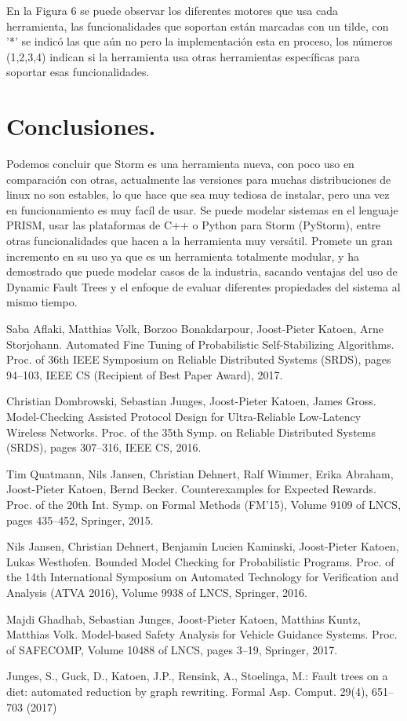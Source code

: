 \documentclass[11pt]{article}
\begin{document}
En la Figura 6 se puede observar los diferentes motores que usa cada herramienta, las funcionalidades que soportan est\'an marcadas con un tilde, con '*' se indic\'o las que a\'un no pero la implementaci\'on esta en proceso, los n\'umeros (1,2,3,4) indican si la herramienta usa otras herramientas espec\'ificas para soportar esas funcionalidades.

\section{Conclusiones.}

Podemos concluir que Storm es una herramienta nueva, con poco uso en comparaci\'on con otras, actualmente las versiones para muchas distribuciones de linux no son estables, lo que hace que sea muy tediosa de instalar, pero una vez en funcionamiento es muy fac\'il de usar. Se puede modelar sistemas en el lenguaje PRISM, usar las plataformas de C++ o Python para Storm (PyStorm), entre otras funcionalidades que hacen a la herramienta muy vers\'atil. Promete un gran incremento en su uso ya que es un herramienta totalmente modular, y ha demostrado que puede modelar casos de la industria, sacando ventajas del uso de Dynamic Fault Trees y el enfoque de evaluar diferentes propiedades del sistema al mismo tiempo.

\begin{thebibliography}{99}
	 Saba Aflaki, Matthias Volk, Borzoo Bonakdarpour, Joost-Pieter Katoen, Arne Storjohann. Automated Fine Tuning of Probabilistic Self-Stabilizing Algorithms. Proc. of 36th IEEE Symposium on Reliable Distributed Systems (SRDS), pages 94–103, IEEE CS (Recipient of Best Paper Award), 2017.	
		
	 Christian Dombrowski, Sebastian Junges, Joost-Pieter Katoen, James Gross. Model-Checking Assisted Protocol Design for Ultra-Reliable Low-Latency Wireless Networks. Proc. of the 35th Symp. on Reliable Distributed Systems (SRDS), pages 307–316, IEEE CS, 2016.
	
	 Tim Quatmann, Nils Jansen, Christian Dehnert, Ralf Wimmer, Erika Abraham, Joost-Pieter Katoen, Bernd Becker. Counterexamples for Expected Rewards. Proc. of the 20th Int. Symp. on Formal Methods (FM'15), Volume 9109 of LNCS, pages 435–452, Springer, 2015.
	
	 Nils Jansen, Christian Dehnert, Benjamin Lucien Kaminski, Joost-Pieter Katoen, Lukas Westhofen. Bounded Model Checking for Probabilistic Programs. Proc. of the 14th International Symposium on Automated Technology for Verification and Analysis (ATVA 2016), Volume 9938 of LNCS, Springer, 2016.
	
	 Majdi Ghadhab, Sebastian Junges, Joost-Pieter Katoen, Matthias Kuntz, Matthias Volk. Model-based Safety Analysis for Vehicle Guidance Systems. Proc. of SAFECOMP, Volume 10488 of LNCS, pages 3–19, Springer, 2017.
	
	 Junges, S., Guck, D., Katoen, J.P., Rensink, A., Stoelinga, M.: Fault trees on a diet: automated reduction by graph rewriting. Formal Asp. Comput. 29(4), 651–703 (2017)

\end{thebibliography}
\end{document}
